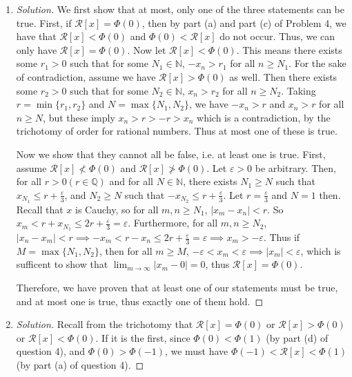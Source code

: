 \documentclass{article}
\newcommand{\N}{{\mathbb N}}
\newcommand{\Q}{{\mathbb Q}}
\newcommand{\ep}{{\varepsilon}}
\newcommand{\SR}{{\mathcal R}}
\begin{document}
\begin{enumerate}
	\item \begin{proof}[Solution]\let\qed\relax
		We first show that at most,
		only one of the three statements can be true.
		First, if $\SR[x] = \Phi(0)$,
		then by part (a) and part (c) of Problem 4,
		we have that $\SR[x] < \Phi(0)$ and $\Phi(0) < \SR[x]$
		do not occur.
		Thus, we can only have $\SR[x] = \Phi(0)$.
		Now let $\SR[x] < \Phi(0)$.
		This means there exists some $r_1>0$ such that for some $N_1 \in \N$,
		$-x_n > r_1$ for all $n \geq N_1$.
		For the sake of contradiction, assume we have $\SR[x] > \Phi(0)$
		as well.
		Then there exists some $r_2>0$ such that for some $N_2 \in \N$,
		$x_n > r_2$ for all $n \geq N_2$.
		Taking $r = \min\{r_1,r_2\}$ and $N = \max\{N_1,N_2\}$,
		we have $-x_n > r$ and $x_n > r$ for all $n \geq N$,
		but these imply $x_n > r > -r > x_n$ which is a contradiction,
		by the trichotomy of order for rational numbers.
		Thus at most one of these is true.

		Now we show that they cannot all be false, i.e. at least one is true.
		First, assume $\SR[x] \not< \Phi(0)$ and $\SR[x] \not> \Phi(0)$.
		Let $\ep > 0$ be arbitrary.
		Then, for all $r > 0 (r \in \Q)$ and for all $N \in \N$,
		there exists $N_1 \geq N$ such that $x_{N_1} \leq r + \frac{\ep}{3}$,
		and $N_2 \geq N$ such that $-x_{N_2} \leq r + \frac{\ep}{3}$.
		Let $r = \frac{\ep}{3}$ and $N = 1$ then.
		Recall that $x$ is Cauchy,
		so for all $m,n \geq N_1$, $|x_m-x_n| < r$.
		So $x_m < r + x_{N_1} \leq 2r + \frac{\ep}{3} = \ep$.
		Furthermore, for all $m,n \geq N_2$, $|x_n - x_m| < r \implies
		-x_m < r - x_n \leq 2r + \frac{\ep}{3} = \ep \implies x_m > -\ep$.
		Thus if $M = \max\{N_1,N_2\}$, then for all $m \geq M$,
		$-\ep < x_m < \ep \implies |x_m| < \ep$,
		which is sufficent to show that $\lim_{m\to\infty}|x_m - 0| = 0$,
		thus $\SR[x] = \Phi(0)$.

		Therefore, we have proven that at least one of our statements
		must be true, and at most one is true,
		thus exactly one of them hold.
	\end{proof}
	\item \begin{proof}[Solution]\let\qed\relax
			Recall from the trichotomy that $\SR[x] = \Phi(0)$
			or $\SR[x] > \Phi(0)$ or $\SR[x] < \Phi(0)$.
			If it is the first,
			since $\Phi(0) < \Phi(1)$ (by part (d) of question 4),
			and $\Phi(0) > \Phi(-1)$,
			we must have $\Phi(-1) < \SR[x] < \Phi(1)$
			(by part (a) of question 4).
			

\end{proof}
\end{enumerate}
\end{document}
